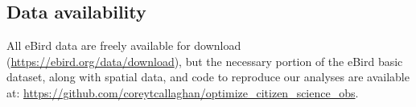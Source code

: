 \documentclass[9pt,twocolumn,twoside,lineno]{pnas-new}
\begin{document}
{\subsection*{Data availability} All eBird data are freely available for download (\url{https://ebird.org/data/download}), but the necessary portion of the eBird basic dataset, along with spatial data, and code to reproduce our analyses are available at: \url{https://github.com/coreytcallaghan/optimize_citizen_science_obs}.
}

\showmatmethods{} %


\showacknow{} %


\end{document}
